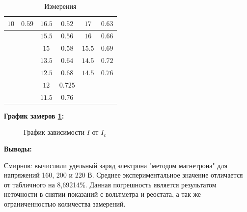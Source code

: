 \begin{table}[!h]
\begin{tabular}{|c|c|c|c|c|c|}
         \hline
         $10$& $0.59$& $16.5$& $0.52$& $17$& $0.63$\\
         \hline
         & & $15.5$& $0.56$& $16$& $0.66$\\
         \hline
         & & $15$& $0.58$& $15.5$& $0.69$\\
         \hline
         & & $13.5$& $0.64$& $14.5$& $0.72$\\
         \hline
         & & $12.5$& $0.68$& $14.5$& $0.76$\\
         \hline
         & & $12$& $0.725$& & \\
         \hline
         & & $11.5$& $0.76$& & \\
         \hline
         
    \end{tabular}
    \caption{Измерения}
    \label{tab:my_label1}
\end{table}


\textbf{График замеров \ref{graph:main_graph}:}


\begin{figure}[!h]
\begin{center}
  \end{center}
\caption{График зависимости $I$ от $I_c$}
\label{graph:main_graph}
\end{figure}

\newpage

\textbf{Выводы:}

Смирнов: вычислили удельный заряд электрона "методом магнетрона" для напряжений 160, 200 и 220 В. Среднее экспериментальное значение отличается от табличного на 8,69214\%. Данная погрешность является результатом неточности в снятии показаний с вольтметра и реостата, а так же ограниченностью количества замерений.


